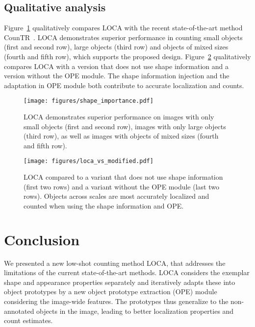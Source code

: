 \documentclass[10pt,twocolumn,letterpaper]{article}
\begin{document}
\subsection{Qualitative analysis}

Figure~\ref{fig:loca_vs_countr} qualitatively compares LOCA with the recent 
state-of-the-art method CounTR~\cite{countr}. LOCA demonstrates superior performance in counting small objects (first and second row), large objects (third row) and objects of mixed sizes (fourth and fifth row), which supports the proposed design. Figure~\ref{fig:loca_vs_modified} qualitatively compares LOCA with a version that does not use shape information and a version without the OPE module. The shape information injection and the adaptation in OPE module both contribute to accurate localization and counts.



\begin{figure}
    \centering
\texttt{[image: figures/shape\_importance.pdf]}
\caption{LOCA demonstrates superior performance on images with only small objects (first and second row), images with only large objects (third row), as well as images with objects of mixed sizes (fourth and fifth row).}
    \label{fig:loca_vs_countr}
\end{figure}

\begin{figure}
    \centering
    \texttt{[image: figures/loca\_vs\_modified.pdf]}
    \caption{
    LOCA compared to a variant that does not use shape information (first two rows) and a variant without the OPE module (last two rows). Objects across scales are most accurately localized and counted when using the shape information and OPE. 
    }
    \label{fig:loca_vs_modified}
\end{figure}


\section{Conclusion}


We presented a new low-shot counting method LOCA, that addresses the limitations of the current state-of-the-art methods. LOCA considers the exemplar shape and appearance properties separately and iteratively adapts these into object prototypes by a new object prototype extraction (OPE) module considering the image-wide features. The prototypes thus generalize to the non-annotated objects in the image, leading to better localization properties and count estimates. 
\end{document}
